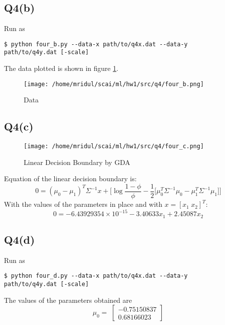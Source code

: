 \documentclass[11pt]{article}
\begin{document}
\subsection{Q4(b)}
\label{sec:org588e992}
\begin{codebox}
Run as
\begin{verbatim}
$ python four_b.py --data-x path/to/q4x.dat --data-y
path/to/q4y.dat [-scale]
\end{verbatim}
\end{codebox}
The data plotted is shown in figure \ref{fig:orgd01715b}.
\begin{figure}[!ht]
\centering
\texttt{[image: /home/mridul/scai/ml/hw1/src/q4/four\_b.png]}
\caption{\label{fig:orgd01715b}Data}
\end{figure}
\clearpage
\subsection{Q4(c)}
\label{sec:org063d9de}
\begin{figure}[!ht]
\centering
\texttt{[image: /home/mridul/scai/ml/hw1/src/q4/four\_c.png]}
\caption{\label{fig:orgf0f2c0a}Linear Decision Boundary by GDA}
\end{figure}
Equation of the linear decision boundary is:
\begin{equation*}
0=(\mu_0-\mu_1)^T\Sigma^{-1}x+\biggl[
\log{\frac{1-\phi}{\phi}}
-\frac{1}{2}\bigl[
\mu_0^T\Sigma^{-1}\mu_0 - \mu_1^T\Sigma^{-1}\mu_1
\bigr]
\biggr]
\end{equation*}
With the values of the parameters in place and with \(x=[x_1\; x_2]^T\):
\begin{equation}
0=-6.43929354\times10^{-15}-3.40633x_1+2.45087x_2
\end{equation}
\subsection{Q4(d)}
\label{sec:org1f9433b}
\begin{codebox}
Run as
\begin{verbatim}
$ python four_d.py --data-x path/to/q4x.dat --data-y
path/to/q4y.dat [-scale]
\end{verbatim}
\end{codebox}
The values of the parameters obtained are
\begin{equation*}
\mu_0 = \;
\begin{bmatrix}
-0.75150837\\
0.68166023
\end{bmatrix}
\end{equation*}
\end{document}
